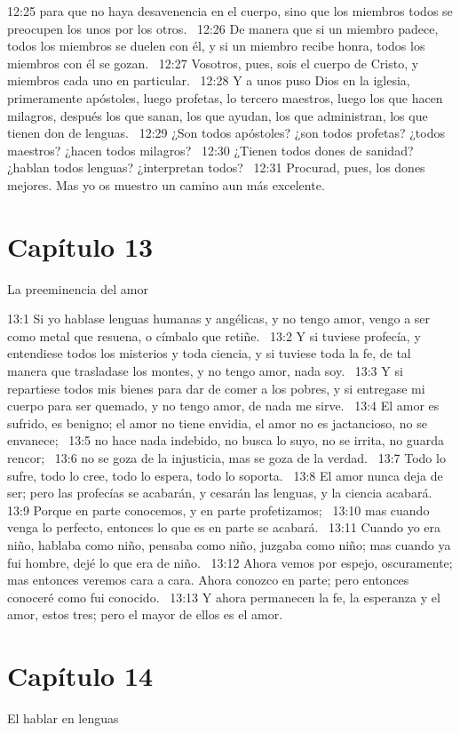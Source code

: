 12:25 para que no haya desavenencia en el cuerpo, sino que los miembros todos se preocupen los unos por los otros.  
12:26 De manera que si un miembro padece, todos los miembros se duelen con él, y si un miembro recibe honra, todos los miembros con él se gozan.  
12:27 Vosotros, pues, sois el cuerpo de Cristo, y miembros cada uno en particular.  
12:28 Y a unos puso Dios en la iglesia, primeramente apóstoles, luego profetas, lo tercero maestros, luego los que hacen milagros, después los que sanan, los que ayudan, los que administran, los que tienen don de lenguas.  
12:29 ¿Son todos apóstoles? ¿son todos profetas? ¿todos maestros? ¿hacen todos milagros?  
12:30 ¿Tienen todos dones de sanidad? ¿hablan todos lenguas? ¿interpretan todos?  
12:31 Procurad, pues, los dones mejores. Mas yo os muestro un camino aun más excelente.  
\section*{Capítulo 13}
La preeminencia del amor  

13:1 Si yo hablase lenguas humanas y angélicas, y no tengo amor, vengo a ser como metal que resuena, o címbalo que retiñe.  
13:2 Y si tuviese profecía, y entendiese todos los misterios y toda ciencia, y si tuviese toda la fe, de tal manera que trasladase los montes, y no tengo amor, nada soy.  
13:3 Y si repartiese todos mis bienes para dar de comer a los pobres, y si entregase mi cuerpo para ser quemado, y no tengo amor, de nada me sirve.  
13:4 El amor es sufrido, es benigno; el amor no tiene envidia, el amor no es jactancioso, no se envanece;  
13:5 no hace nada indebido, no busca lo suyo, no se irrita, no guarda rencor;  
13:6 no se goza de la injusticia, mas se goza de la verdad.  
13:7 Todo lo sufre, todo lo cree, todo lo espera, todo lo soporta.  
13:8 El amor nunca deja de ser; pero las profecías se acabarán, y cesarán las lenguas, y la ciencia acabará.  
13:9 Porque en parte conocemos, y en parte profetizamos;  
13:10 mas cuando venga lo perfecto, entonces lo que es en parte se acabará.  
13:11 Cuando yo era niño, hablaba como niño, pensaba como niño, juzgaba como niño; mas cuando ya fui hombre, dejé lo que era de niño.  
13:12 Ahora vemos por espejo, oscuramente; mas entonces veremos cara a cara. Ahora conozco en parte; pero entonces conoceré como fui conocido.  
13:13 Y ahora permanecen la fe, la esperanza y el amor, estos tres; pero el mayor de ellos es el amor.  
\section*{Capítulo 14}
El hablar en lenguas  


